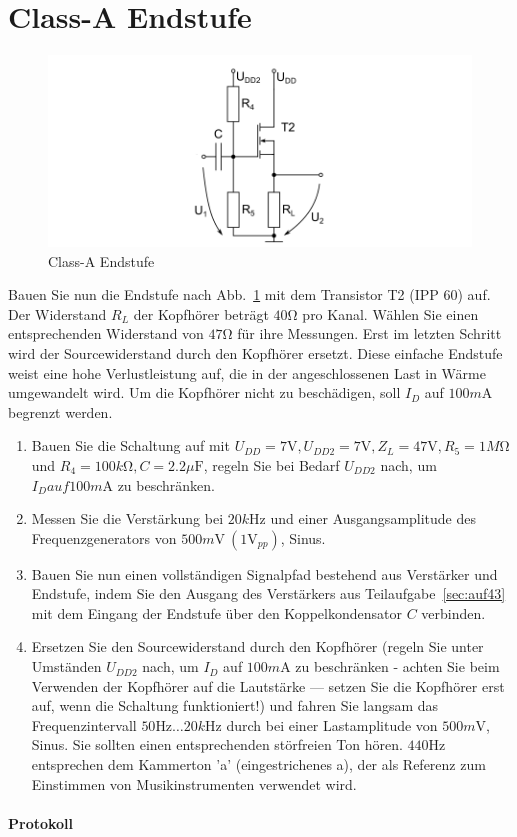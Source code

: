 \documentclass[10pt]{scrreprt}
\begin{document}
    \section{Class-A Endstufe}
    \begin{figure}[H]
        \includegraphics[width=\textwidth]{abb11.png}
        \caption{Class-A Endstufe}
        \label{fig:abb11}
    \end{figure}
    Bauen Sie nun die Endstufe nach Abb.~\ref{fig:abb11} mit dem Transistor T2 (IPP 60) auf. Der
    Widerstand $R_L$ der Kopfhörer beträgt $40\si{\ohm}$ pro Kanal. Wählen Sie einen entsprechenden
    Widerstand von $47\si{\ohm}$ für ihre Messungen. Erst im letzten Schritt wird der Sourcewiderstand
    durch den Kopfhörer ersetzt. Diese einfache Endstufe weist eine hohe Verlustleistung auf,
    die in der angeschlossenen Last in Wärme umgewandelt wird. Um die Kopfhörer nicht zu
    beschädigen, soll $I_D$ auf $100\si{m\ampere}$ begrenzt werden.
    \begin{enumerate}
        \item Bauen Sie die Schaltung auf mit $U_{DD} = 7\si{\volt}, U_{DD2} = 7\si{\volt}, Z_L = 47\si{\volt}, R_5 = 1\si{M\ohm}$ und
            $R_4 = 100\si{k\ohm}, C = 2.2\si{\mu \farad}$, regeln Sie bei Bedarf $U_{DD2}$ nach, um $I_D auf 100\si{m\ampere}$ zu
            beschränken.
        \item Messen Sie die Verstärkung bei $20\si{k\hertz}$ und einer Ausgangsamplitude des
            Frequenzgenerators von $500\si{m\volt}\ (1\si{\volt}_{pp})$, Sinus.
        \item Bauen Sie nun einen vollständigen Signalpfad bestehend aus Verstärker und
            Endstufe, indem Sie den Ausgang des Verstärkers aus Teilaufgabe~\ref{sec:auf43} mit dem Eingang
            der Endstufe über den Koppelkondensator $C$ verbinden.
        \item Ersetzen Sie den Sourcewiderstand durch den Kopfhörer (regeln Sie unter
            Umständen $U_{DD2}$ nach, um $I_D$ auf $100\si{m\ampere}$ zu beschränken - achten Sie beim Verwenden der
            Kopfhörer auf die Lautstärke --- setzen Sie die Kopfhörer erst auf, wenn die
            Schaltung funktioniert!) und fahren Sie langsam das Frequenzintervall $50\si{\hertz} \ldots 20\si{k\hertz}$
            durch bei einer Lastamplitude von $500\si{m\volt}$, Sinus. Sie sollten einen entsprechenden
            störfreien Ton hören. $440\si{\hertz}$ entsprechen dem Kammerton ’a’ (eingestrichenes a),
            der als Referenz zum Einstimmen von Musikinstrumenten verwendet wird.
    \end{enumerate}

    \paragraph{Protokoll}
\end{document}

